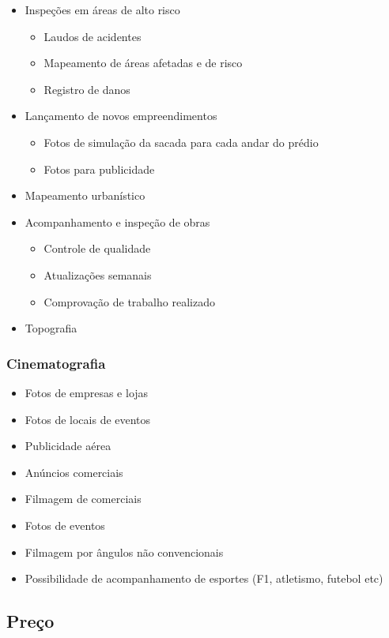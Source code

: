 \begin{itemize}
	\item Inspeções em áreas de alto risco
	\begin{itemize}
		\item Laudos de acidentes
		\item Mapeamento de áreas afetadas e de risco
		\item Registro de danos
	\end{itemize}	
	\item Lançamento de novos empreendimentos
	\begin{itemize}
		\item Fotos de simulação da sacada para cada andar do prédio
		\item Fotos para publicidade
	\end{itemize}	
	\item Mapeamento urbanístico
	\item Acompanhamento e inspeção de obras
	\begin{itemize}
		\item Controle de qualidade
		\item Atualizações semanais
		\item Comprovação de trabalho realizado		
	\end{itemize}
	\item Topografia
\end{itemize}

\subsubsection*{Cinematografia}

\begin{itemize}
	\item Fotos de empresas e lojas
	\item Fotos de locais de eventos
	\item Publicidade aérea
	\item Anúncios comerciais
	\item Filmagem de comerciais
	\item Fotos de eventos
	\item Filmagem por ângulos não convencionais
	\item Possibilidade de acompanhamento de esportes (F1, atletismo, futebol etc)
\end{itemize}

\subsection{Preço}

